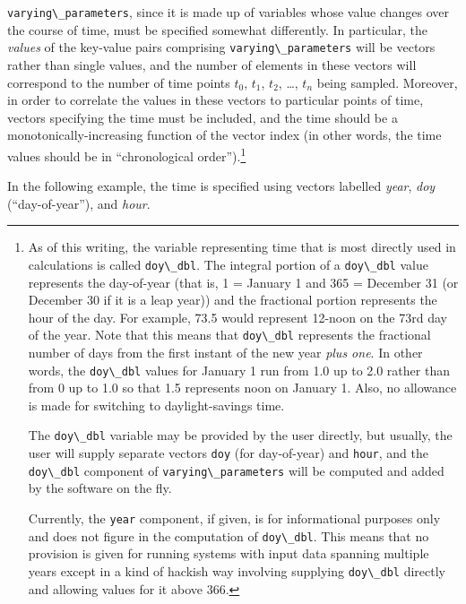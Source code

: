 \documentclass{article}\usepackage[]{graphicx}\usepackage[]{color}
\newcommand{\code}[1]{\lstinline[style=C++style]{#1}}
\begin{document}
\code{varying\_parameters}, since it is made up of variables whose
value changes over the course of time, must be specified somewhat
differently.  In particular, the \emph{values} of the key-value pairs
comprising \code{varying\_parameters} will be vectors rather than
single values, and the number of elements in these vectors will
correspond to the number of time points $t_0$, $t_1$, $t_2$, \dots,
$t_n$ being sampled.  Moreover, in order to correlate the values in
these vectors to particular points of time, vectors specifying the
time must be included, and the time should be a
monotonically-increasing function of the vector index (in other words,
the time values should be in ``chronological order'').\footnote{As of
  this writing, the variable representing time that is most directly
  used in calculations is called \code{doy\_dbl}.  The integral
  portion of a \code{doy\_dbl} value represents the day-of-year (that
  is, 1 = January 1 and 365 = December 31 (or December 30 if it is a
  leap year)) and the fractional portion represents the hour of the
  day.  For example, 73.5 would represent 12-noon on the 73rd day of
  the year.  Note that this means that \code{doy\_dbl} represents the
  fractional number of days from the first instant of the new year
  \emph{plus one}.  In other words, the \code{doy\_dbl} values for
  January 1 run from 1.0 up to 2.0 rather than from 0 up to 1.0 so
  that 1.5 represents noon on January 1.  Also, no allowance is made
  for switching to daylight-savings time.

  The \code{doy\_dbl} variable may be provided by the user directly,
  but usually, the user will supply separate vectors \code{doy} (for
  day-of-year) and \code{hour}, and the \code{doy\_dbl} component of
  \code{varying\_parameters} will be computed and added by the
  software on the fly.

  Currently, the \code{year} component, if given, is for informational
  purposes only and does not figure in the computation of
  \code{doy\_dbl}.  This means that no provision is given for running
  systems with input data spanning multiple years except in a kind of
  hackish way involving supplying \code{doy\_dbl} directly and
  allowing values for it above 366.}

In the following example, the time is specified using vectors labelled
\emph{year}, \emph{doy} (``day-of-year''), and \emph{hour}.
\end{document}
